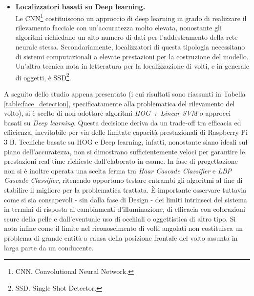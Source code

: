 \documentclass[12pt]{article}
\begin{document}
\begin{itemize}
\begin{itemize}
		\item \textbf{Localizzatori basati su Deep learning.}\\
		Le CNN\footnote{CNN. Convolutional Neural Network.} costituiscono un approccio di deep learning in grado di realizzare il rilevamento facciale con un'accuratezza molto elevata, nonostante gli algoritmi richiedano un alto numero di dati per l'addestramento della rete neurale stessa. Secondariamente, localizzatori di questa tipologia necessitano di sistemi computazionali a elevate prestazioni per la costruzione del modello. Un'altra tecnica nota in letteratura per la localizzazione di volti, e in generale di oggetti, è SSD\footnote{SSD. Single Shot Detector.}.
	\end{itemize}
\end{itemize}

A seguito dello studio appena presentato (i cui risultati sono riassunti in Tabella \ref{table:face_detection}, specificatamente alla problematica del rilevamento del volto), si è scelto di non adottare algoritmi \textit{HOG + Linear SVM} o approcci basati su \textit{Deep learning}. Questa decisione deriva da un trade-off tra efficacia ed efficienza, inevitabile per via delle limitate capacità prestazionali di Raspberry Pi 3 B. Tecniche basate su HOG e Deep learning, infatti, nonostante siano ideali sul piano dell'accuratezza, non si dimostrano sufficientemente veloci per garantire le prestazioni real-time richieste dall'elaborato in esame. In fase di progettazione non si è inoltre operata una scelta ferma tra \textit{Haar Cascade Classifier} e \textit{LBP Cascade Classifier}, ritenendo opportuno testare entrambi gli algoritmi al fine di stabilire il migliore per la problematica trattata. È importante osservare tuttavia come si sia consapevoli - sin dalla fase di Design - dei limiti intrinseci del sistema in termini di risposta ai cambiamenti d'illuminazione, di efficacia con colorazioni scure della pelle e dall'eventuale uso di occhiali o oggettistica di altro tipo. Si nota infine come il limite nel riconoscimento di volti angolati non costituisca un problema di grande entità a causa della posizione frontale del volto assunta in larga parte da un conducente.
\end{document}
